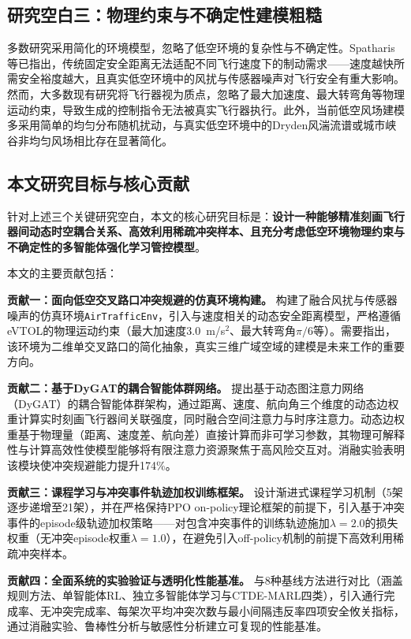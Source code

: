 \documentclass[12pt,a4paper,UTF8]{ctexart}
\begin{document}
\subsection{研究空白三：物理约束与不确定性建模粗糙}

多数研究采用简化的环境模型，忽略了低空环境的复杂性与不确定性。Spatharis等已指出，传统固定安全距离无法适配不同飞行速度下的制动需求——速度越快所需安全裕度越大，且真实低空环境中的风扰与传感器噪声对飞行安全有重大影响\cite{ref7}。然而，大多数现有研究将飞行器视为质点，忽略了最大加速度、最大转弯角等物理运动约束，导致生成的控制指令无法被真实飞行器执行。此外，当前低空风场建模多采用简单的均匀分布随机扰动，与真实低空环境中的Dryden风湍流谱或城市峡谷非均匀风场相比存在显著简化。

\subsection{本文研究目标与核心贡献}

针对上述三个关键研究空白，本文的核心研究目标是：\textbf{设计一种能够精准刻画飞行器间动态时空耦合关系、高效利用稀疏冲突样本、且充分考虑低空环境物理约束与不确定性的多智能体强化学习管控模型}。

本文的主要贡献包括：

\textbf{贡献一：面向低空交叉路口冲突规避的仿真环境构建。} 构建了融合风扰与传感器噪声的仿真环境\texttt{AirTrafficEnv}，引入与速度相关的动态安全距离模型，严格遵循eVTOL的物理运动约束（最大加速度3.0~m/s$^2$、最大转弯角$\pi/6$等）。需要指出，该环境为二维单交叉路口的简化抽象，真实三维广域空域的建模是未来工作的重要方向。

\textbf{贡献二：基于DyGAT的耦合智能体群网络。} 提出基于动态图注意力网络（DyGAT）的耦合智能体群架构，通过距离、速度、航向角三个维度的动态边权重计算实时刻画飞行器间关联强度，同时融合空间注意力与时序注意力。动态边权重基于物理量（距离、速度差、航向差）直接计算而非可学习参数，其物理可解释性与计算高效性使模型能够将有限注意力资源聚焦于高风险交互对。消融实验表明该模块使冲突规避能力提升174\%。

\textbf{贡献三：课程学习与冲突事件轨迹加权训练框架。} 设计渐进式课程学习机制（5架逐步递增至21架），并在严格保持PPO on-policy理论框架的前提下，引入基于冲突事件的episode级轨迹加权策略——对包含冲突事件的训练轨迹施加$\lambda=2.0$的损失权重（无冲突episode权重$\lambda=1.0$），在避免引入off-policy机制的前提下高效利用稀疏冲突样本。

\textbf{贡献四：全面系统的实验验证与透明化性能基准。} 与8种基线方法进行对比（涵盖规则方法、单智能体RL、独立多智能体学习与CTDE-MARL四类），引入通行完成率、无冲突完成率、每架次平均冲突次数与最小间隔违反率四项安全攸关指标，通过消融实验、鲁棒性分析与敏感性分析建立可复现的性能基准。
\end{document}
